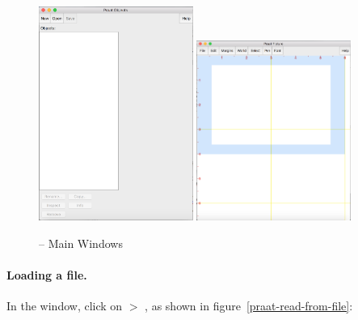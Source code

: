 \begin{figure}[!tbp]
\caption{\Praat{} -- Main Windows}
\label{praat-main-windows}
	\begin{center}
		\includegraphics[width=0.45\textwidth]{./figures/Praat-01-Objects-Window}
		\includegraphics[width=0.45\textwidth]{./figures/Praat-02-Picture-Window}
	\end{center}
\end{figure}

\paragraph{Loading a file.} In the  window, click on  $>$ , as shown in figure~\ref{praat-read-from-file}:

